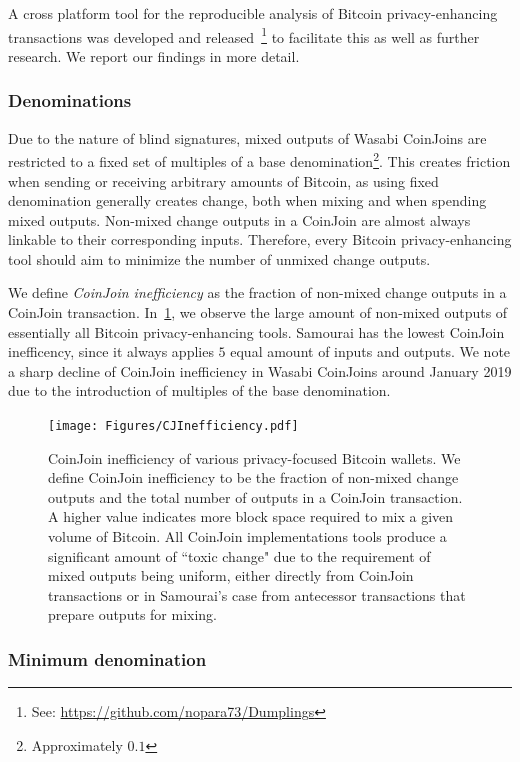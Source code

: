\documentclass[a4paper]{article}
\def\bitcoinA{%
  \leavevmode
  \vtop{\offinterlineskip %
    \setbox0=\hbox{B}%
    \setbox2=\hbox to\wd0{\hfil\hskip-.03em
    \vrule height .3ex width .15ex\hskip .08em
    \vrule height .3ex width .15ex\hfil}
    \vbox{\copy2\box0}\box2}}
\def\bitcoinA{%
  \leavevmode
  \vtop{\offinterlineskip %
    \setbox0=\hbox{B}%
    \setbox2=\hbox to\wd0{\hfil\hskip-.03em
    \vrule height .3ex width .15ex\hskip .08em
    \vrule height .3ex width .15ex\hfil}
    \vbox{\copy2\box0}\box2}}
\begin{document}
A cross platform tool for the reproducible analysis of Bitcoin privacy-enhancing transactions was developed and released~\footnote{See: \url{https://github.com/nopara73/Dumplings}} to facilitate this as well as further research. We report our findings in more detail.

\subsubsection{Denominations}

Due to the nature of blind signatures, mixed outputs of Wasabi CoinJoins are restricted to a fixed set of multiples of a base denomination\footnote{Approximately $0.1$\bitcoinA{}}. This creates friction when sending or receiving arbitrary amounts of Bitcoin, as using fixed denomination generally creates change, both when mixing and when spending mixed outputs. Non-mixed change outputs in a CoinJoin are almost always linkable to their corresponding inputs. Therefore, every Bitcoin privacy-enhancing tool should aim to minimize the number of unmixed change outputs.

We define \emph{CoinJoin inefficiency} as the fraction of non-mixed change outputs in a CoinJoin transaction. In~\cref{fig:cjinefficiency}, we observe the large amount of non-mixed outputs of essentially all Bitcoin privacy-enhancing tools. Samourai has the lowest CoinJoin inefficency, since it always applies $5$ equal amount of inputs and outputs. We note a sharp decline of CoinJoin inefficiency in Wasabi CoinJoins around January 2019 due to the introduction of multiples of the base denomination.

\begin{figure}[h!]
    \centering
    \texttt{[image: Figures/CJInefficiency.pdf]}
    \caption{CoinJoin inefficiency of various privacy-focused Bitcoin wallets. We define CoinJoin inefficiency to be the fraction of non-mixed change outputs and the total number of outputs in a CoinJoin transaction. A higher value indicates more block space required to mix a given volume of Bitcoin. All CoinJoin implementations tools produce a significant amount of ``toxic change" due to the requirement of mixed outputs being uniform, either directly from CoinJoin transactions or in Samourai's case from antecessor transactions that prepare outputs for mixing.}
    \label{fig:cjinefficiency}
\end{figure}

\subsubsection{Minimum denomination}
\end{document}
